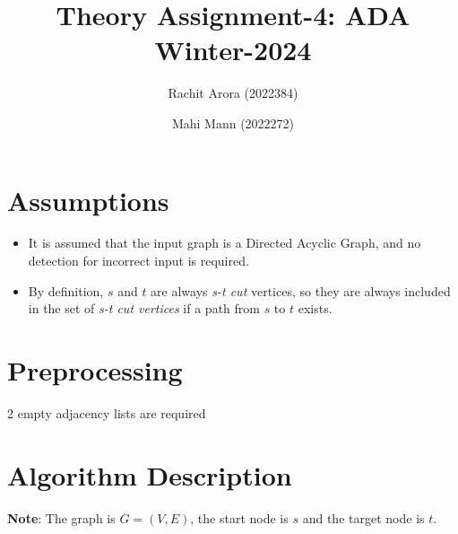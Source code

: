 \documentclass{article}
\title{Theory Assignment-4: ADA Winter-2024}
\author{Rachit Arora (2022384) \and Mahi Mann (2022272)}
\date{}
\begin{document}
\maketitle

\section{Assumptions}

\begin{itemize}
    \item It is assumed that the input graph is a Directed Acyclic Graph, and no detection for incorrect input is required.

    \item By definition, $s$ and $t$ are always \emph{s-t cut} vertices, so they are always included in the set of \emph{s-t cut vertices} if a path from $s$ to $t$ exists. 
\end{itemize}

\section{Preprocessing}

2 empty adjacency lists are required 

\section{Algorithm Description}

\textbf{Note}: The graph is $G = (V,E)$, the start node is $s$ and the target node is $t$.
\end{document}
